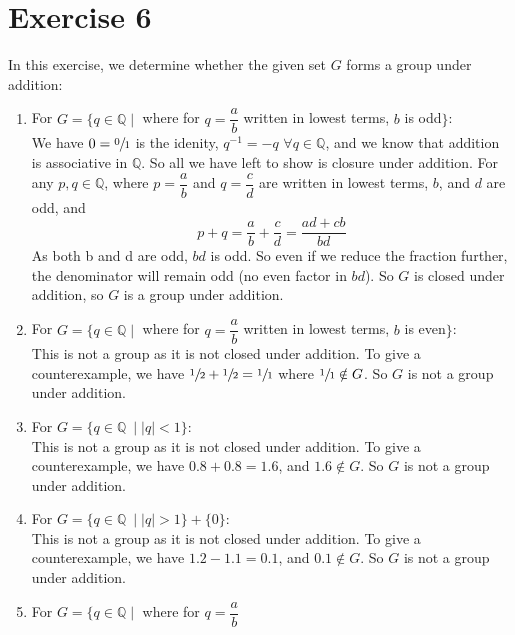 \documentclass{article}
\newcommand{\Q}{\mathbb{Q}}
\begin{document}
    \section*{Exercise 6}
    In this exercise, we determine whether the given set $G$ forms a group
    under addition:
    \begin{enumerate}[label=\textbf{\alph*.}]
        \item
            For $G = \{q \in \Q \mid$ where for $q = \dfrac{a}{b}$
            written in lowest terms, $b$ is odd$\}$: \\
            We have $0 = \sfrac{0}{1}$ is the idenity,
            $q^{-1} = -q$ $\forall q \in \Q$,
            and we know that addition is associative in $\Q$.
            So all we have left to show is closure under addition.
            For any $p, q \in \Q$,
            where $p = \dfrac{a}{b}$ and $q = \dfrac{c}{d}$
            are written in lowest terms, $b$, and $d$ are odd,
            and \[p + q = \dfrac{a}{b} + \dfrac{c}{d} = \dfrac{ad + cb}{bd}\]
            As both b and d are odd, $bd$ is odd.
            So even if we reduce the fraction further,
            the denominator will remain odd (no even factor in $bd$).
            So $G$ is closed under addition,
            so $G$ is a group under addition.
        \item
            For $G = \{q \in \Q \mid$ where for $q = \dfrac{a}{b}$
            written in lowest terms, $b$ is even$\}$: \\
            This is not a group as it is not closed under addition.
            To give a counterexample,
            we have $\sfrac{1}{2} + \sfrac{1}{2} = \sfrac{1}{1}$
            where $\sfrac{1}{1} \notin G$.
            So $G$ is not a group under addition.
        \item
            For $G = \{q \in \Q\ \mid |q| < 1\}$: \\
            This is not a group as it is not closed under addition.
            To give a counterexample,
            we have $0.8 + 0.8 = 1.6$, and $1.6 \notin G$.
            So $G$ is not a group under addition.
        \item
            For $G = \{q \in \Q\ \mid |q| > 1\} + \{0\}$: \\
            This is not a group as it is not closed under addition.
            To give a counterexample,
            we have $1.2 - 1.1 = 0.1$, and $0.1 \notin G$.
            So $G$ is not a group under addition.
        \item
            For $G = \{q \in \Q \mid$ where for $q = \dfrac{a}{b}$

\end{enumerate}
\end{document}
